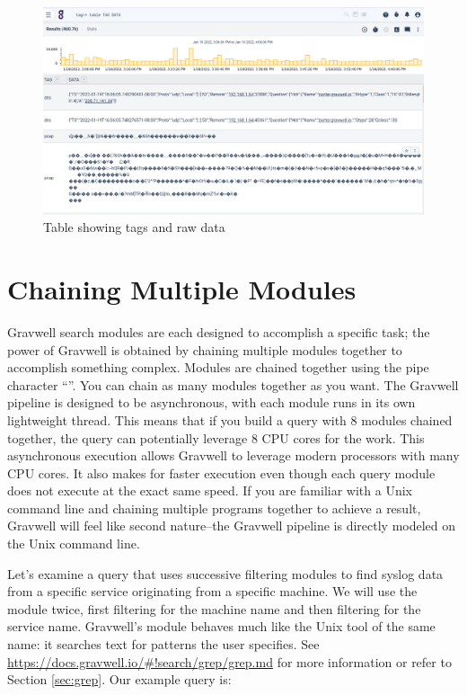 \begin{figure}
	\includegraphics{images/table-tag-data.png}
	\caption{Table showing tags and raw data}
	\label{fig:tag-data-table}
\end{figure}
\clearpage




\section{Chaining Multiple Modules}

Gravwell search modules are each designed to accomplish a specific
task; the power of Gravwell is obtained by chaining multiple modules
together to accomplish something complex. Modules are chained together
using the pipe character ``\textbar{}''. You can chain as many modules
together as you want. The Gravwell pipeline is designed to be
asynchronous, with each module runs in its own lightweight thread. This
means that if you build a query with 8 modules chained together, the
query can potentially leverage 8 CPU cores for the work. This
asynchronous execution allows Gravwell to leverage modern processors
with many CPU cores. It also makes for faster execution even though each
query module does not execute at the exact same speed. If you are
familiar with a Unix command line and chaining multiple programs
together to achieve a result, Gravwell will feel like second
nature--the Gravwell pipeline is directly modeled on the Unix command
line.

Let's examine a query that uses successive filtering modules to find
syslog data from a specific service originating from a specific machine.
We will use the
 module
twice, first filtering for the machine name and then filtering for the
service name. Gravwell's  module behaves much like the Unix tool of the same name: it searches text for patterns the user specifies. See \href{https://docs.gravwell.io/\#!search/grep/grep.md}{https://docs.gravwell.io/\#!search/grep/grep.md} for more information or refer to Section \ref{sec:grep}. Our example query is:

